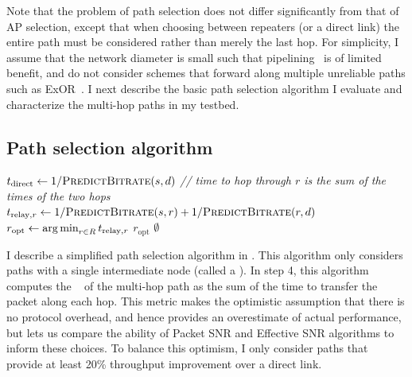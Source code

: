 Note that the problem of path selection does not differ significantly from that of AP selection, except that when choosing between repeaters (or a direct link) the entire path must be considered rather than merely the last hop. For simplicity, I assume that the network diameter is small such that pipelining~\cite{Rodrig_thesis} is of limited benefit, and do not consider schemes that forward along multiple unreliable paths such as ExOR~\cite{Biswas_ExOR}. I next describe the basic path selection algorithm I evaluate and characterize the multi-hop paths in my testbed.


\subsection{Path selection algorithm}
\begin{algorithm}[tp]
\caption{\label{alg:relay_sel_basic}}
\begin{algorithmic}[1]
\STATE $t_\text{direct} \gets 1/\textsc{PredictBitrate}(s,d)$ 
\STATE \emph{// time to hop through $r$ is the sum of the times of the two hops}
\STATE $t_{\text{relay},r} \gets 1/\textsc{PredictBitrate}(s,r) + 1/\textsc{PredictBitrate}(r,d)$
\ENDFOR
\STATE $r_\text{opt} \gets \operatorname*{arg\,min}_{r\in R} t_{\text{relay},r}$ 
\RETURN $r_\text{opt}$ 
\ELSE
\RETURN $\emptyset$ 
\ENDIF
\end{algorithmic}
\end{algorithm}

I describe a simplified path selection algorithm in . This  algorithm only considers paths with a single intermediate node (called a ). In step 4, this algorithm computes the ~\cite{Draves_ETT} of the multi-hop path as the sum of the time to transfer the packet along each hop. This metric makes the optimistic assumption that there is no protocol overhead, and hence provides an overestimate of actual performance, but lets us compare the ability of Packet SNR and Effective SNR algorithms to inform these choices. To balance this optimism, I only consider paths that provide at least 20\% throughput improvement over a direct link.

